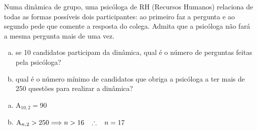 \begin{ex}
Numa dinâmica de grupo, uma psicóloga de RH (Recursos Humanos) relaciona de todas as formas possíveis dois participantes: ao primeiro faz a pergunta e ao segundo pede que comente a resposta do colega. Admita que a psicóloga não fará a mesma pergunta mais de uma vez.
   \begin{enumerate}[(a)]
   \item se 10 candidatos participam da dinâmica, qual é o número de perguntas feitas pela psicóloga?
   \item qual é o número  mínimo de candidatos que obriga a psicóloga a ter mais de 250 questões para realizar a dinâmica?
   \end{enumerate}
      \begin{sol}
      \phantom{A}
        \begin{enumerate} [(a)]
            \item $\mathrm{A}_{{10},2}=90$
            \item $\mathrm{A}_{n,2}>250 \Longrightarrow n>16\hspace{0,3cm} \therefore \hspace{0,3cm}n=17$
        \end{enumerate}
      \end{sol}
\end{ex}